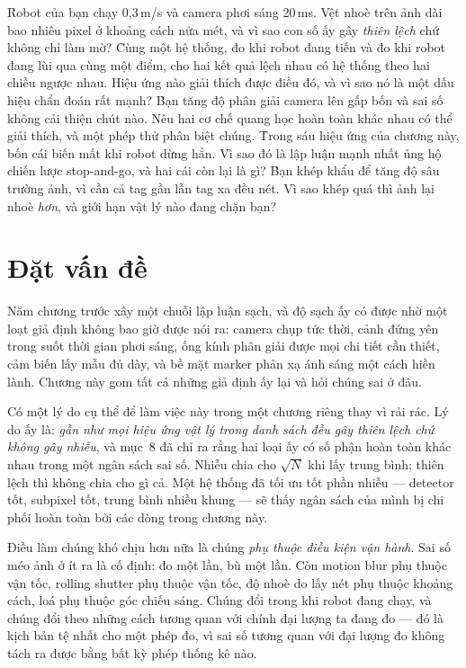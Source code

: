 \documentclass[../../marker.tex]{subfiles}
\begin{document}
\begin{khoigoi}
\h{Robot của bạn chạy 0,3\,m/s và camera phơi sáng 20\,ms. Vệt nhoè trên ảnh dài bao nhiêu pixel ở khoảng cách nửa mét, và vì sao con số ấy gây \emph{thiên lệch} chứ không chỉ làm mờ?}
\h{Cùng một hệ thống, đo khi robot đang tiến và đo khi robot đang lùi qua cùng một điểm, cho hai kết quả lệch nhau có hệ thống theo hai chiều ngược nhau. Hiệu ứng nào giải thích được điều đó, và vì sao nó là một dấu hiệu chẩn đoán rất mạnh?}
\h{Bạn tăng độ phân giải camera lên gấp bốn và sai số không cải thiện chút nào. Nêu hai cơ chế quang học hoàn toàn khác nhau có thể giải thích, và một phép thử phân biệt chúng.}
\h{Trong sáu hiệu ứng của chương này, bốn cái biến mất khi robot dừng hẳn. Vì sao đó là lập luận mạnh nhất ủng hộ chiến lược stop-and-go, và hai cái còn lại là gì?}
\h{Bạn khép khẩu để tăng độ sâu trường ảnh, vì cần cả tag gần lẫn tag xa đều nét. Vì sao khép quá thì ảnh lại nhoè \emph{hơn}, và giới hạn vật lý nào đang chặn bạn?}
\end{khoigoi}

\section{Đặt vấn đề}

Năm chương trước xây một chuỗi lập luận sạch, và độ sạch ấy có được nhờ một loạt giả định không bao giờ được nói ra: camera chụp tức thời, cảnh đứng yên trong suốt thời gian phơi sáng, ống kính phân giải được mọi chi tiết cần thiết, cảm biến lấy mẫu đủ dày, và bề mặt marker phản xạ ánh sáng một cách hiền lành. Chương này gom tất cả những giả định ấy lại và hỏi chúng sai ở đâu.

Có một lý do cụ thể để làm việc này trong một chương riêng thay vì rải rác. Lý do ấy là: \emph{gần như mọi hiệu ứng vật lý trong danh sách đều gây thiên lệch chứ không gây nhiễu}, và  mục~8 đã chỉ ra rằng hai loại ấy có số phận hoàn toàn khác nhau trong một ngân sách sai số. Nhiễu chia cho \(\sqrt{N}\) khi lấy trung bình; thiên lệch thì không chia cho gì cả. Một hệ thống đã tối ưu tốt phần nhiễu --- detector tốt, subpixel tốt, trung bình nhiều khung --- sẽ thấy ngân sách của mình bị chi phối hoàn toàn bởi các dòng trong chương này.

Điều làm chúng khó chịu hơn nữa là chúng \emph{phụ thuộc điều kiện vận hành}. Sai số méo ảnh ở  ít ra là cố định: đo một lần, bù một lần. Còn motion blur phụ thuộc vận tốc, rolling shutter phụ thuộc vận tốc, độ nhoè do lấy nét phụ thuộc khoảng cách, loá phụ thuộc góc chiếu sáng. Chúng đổi trong khi robot đang chạy, và chúng đổi theo những cách tương quan với chính đại lượng ta đang đo --- đó là kịch bản tệ nhất cho một phép đo, vì sai số tương quan với đại lượng đo không tách ra được bằng bất kỳ phép thống kê nào.
\end{document}
